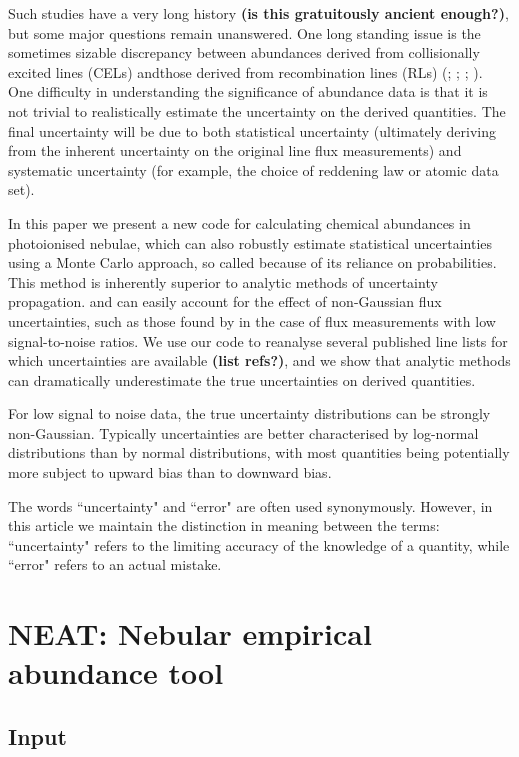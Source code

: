 \documentclass[useAMS,usenatbib]{mn2e}
\begin{document}
Such studies have a very long history \citep{1864RSPT..154..437H} \textbf{(is this gratuitously ancient enough?)}, but some major questions remain unanswered.  One long standing issue is the sometimes sizable discrepancy between abundances derived from collisionally excited lines (CELs) andthose derived from recombination lines (RLs) (\citealt{2005MNRAS.362..424W}; \citet{2006MNRAS.368.1959L}; \citealt{2007ApJ...670..457G}; \citealt{2008MNRAS.386...22T}).  One difficulty in understanding the significance of abundance data is that it is not trivial to realistically estimate the uncertainty on the derived quantities.  The final uncertainty will be due to both statistical uncertainty (ultimately deriving from the inherent uncertainty on the original line flux measurements) and systematic uncertainty (for example, the choice of reddening law or atomic data set).

In this paper we present a new code for calculating chemical abundances in photoionised nebulae, which can also robustly estimate statistical uncertainties using a Monte Carlo approach, so called because of its reliance on probabilities.  This method is inherently superior to analytic methods of uncertainty propagation. and can easily account for the effect of non-Gaussian flux uncertainties, such as those found by \citet{1994A&A...287..676R} in the case of flux measurements with low signal-to-noise ratios.  We use our code to reanalyse several published line lists for which uncertainties are available \textbf{(list refs?)}, and we show that analytic methods can dramatically underestimate the true uncertainties on derived quantities.

For low signal to noise data, the true uncertainty distributions can be strongly non-Gaussian.  Typically uncertainties are better characterised by log-normal distributions than by normal distributions, with most quantities being potentially more subject to upward bias than to downward bias.

The words ``uncertainty" and ``error" are often used synonymously.  However, in this article we maintain the distinction in meaning between the terms: ``uncertainty" refers to the limiting accuracy of the knowledge of a quantity, while ``error" refers to an actual mistake.

\section{NEAT: Nebular empirical abundance tool}

\subsection{Input}
\end{document}
